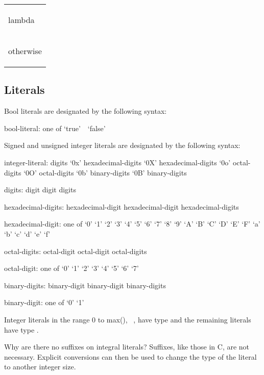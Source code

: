 \begin{tabular}{l}
\begin{chapel}
lambda
\end{chapel} \\
\begin{invisible}
otherwise
\end{invisible}
\end{tabular}

\subsection{Literals}
\label{Literals}
\label{Primitive_Type_Literals}

Bool literals are designated by the following syntax:
\begin{syntax}
bool-literal: one of
  `true' $ $ $ $ `false'
\end{syntax}

Signed and unsigned integer literals are designated by the following
syntax:
\begin{syntax}
integer-literal:
  digits
  `0x' hexadecimal-digits
  `0X' hexadecimal-digits
  `0o' octal-digits
  `0O' octal-digits
  `0b' binary-digits
  `0B' binary-digits

digits:
  digit
  digit digits

hexadecimal-digits:
  hexadecimal-digit
  hexadecimal-digit hexadecimal-digits

hexadecimal-digit: one of
  `0' `1' `2' `3' `4' `5' `6' `7' `8' `9' `A' `B' `C' `D' `E' `F' `a' `b' `c' `d' `e' `f'

octal-digits:
  octal-digit
  octal-digit octal-digits

octal-digit: one of
  `0' `1' `2' `3' `4' `5' `6' `7'

binary-digits:
  binary-digit
  binary-digit binary-digits

binary-digit: one of
  `0' `1'
\end{syntax}

Integer literals in the range 0 to max(), ~,
have type  and the remaining literals have type .

\begin{rationale}
Why are there no suffixes on integral literals?  Suffixes, like those
in C, are not necessary.  Explicit
conversions can then be used to change the type of the literal to
another integer size.
\end{rationale}

